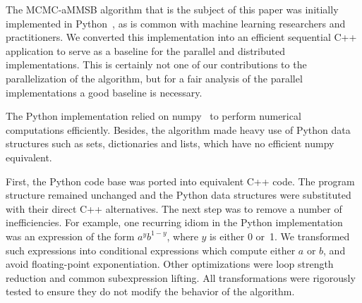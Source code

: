 The MCMC-aMMSB algorithm that is the subject of this paper was initially
implemented in Python~\cite{LiAW15}, as is common
with machine learning researchers and practitioners.
We converted this implementation into an efficient sequential C++ application
to serve as a baseline for the parallel and distributed implementations.
This is certainly not one of our contributions to the parallelization
of the algorithm, but for a fair analysis of the parallel implementations
a good baseline is necessary.

The Python implementation
relied on numpy~\cite{numpy} to perform numerical computations efficiently.
Besides, the algorithm
made heavy use of Python data structures such as sets, dictionaries and
lists, which have no efficient numpy equivalent.

First, the Python code base was ported into equivalent C++ code.
The program structure remained unchanged and the Python data structures were
substituted with their direct C++ alternatives.
%
The next step was to remove a number of inefficiencies.
For example, one recurring idiom in the Python implementation
was an expression of the form $a^y b^{1-y}$, where $y$ is either 0 or~1.
We transformed such expressions into conditional expressions which
compute either $a$ or $b$, and avoid floating-point exponentiation.
%
Other optimizations were loop strength
reduction and common subexpression lifting.
%
All transformations were rigorously tested to ensure they do
not modify the behavior of the algorithm.
%
\begin{comment}
Further, we replaced calls to the system's random
functions with a custom implementation of the random generator
\textit{xorshift\_128}~\cite{Marsaglia:2003:XR}. This way, random calls no longer
involve system calls, so we can support easy and fast multi-threaded random
calls by providing each thread with its private, differently seeded, random
generator.
\end{comment}
